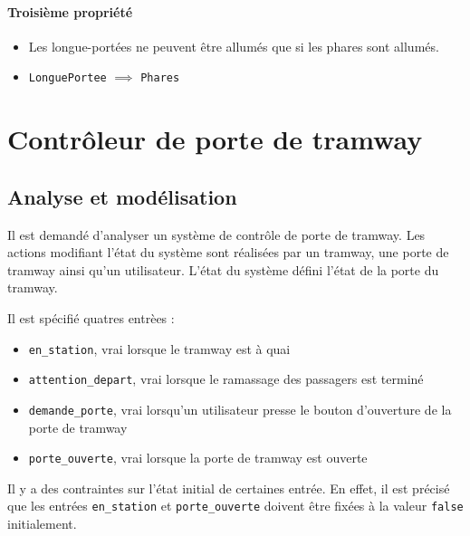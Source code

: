 \documentclass{article}
\begin{document}
      \paragraph{Troisième propriété}
        \begin{itemize}
          \item[] Les longue-portées ne peuvent être allumés que si les phares
            sont allumés.
          \item[] \noindent
            {\tt LonguePortee} $\implies$ {\tt Phares}
        \end{itemize}

  \section{Contrôleur de porte de tramway}
    \subsection{Analyse et modélisation}

      Il est demandé d'analyser un système de contrôle de porte de tramway. Les
      actions modifiant l'état du système sont réalisées par un tramway, une
      porte de tramway ainsi qu'un utilisateur. L'état du système défini l'état
      de la porte du tramway. \medskip

      Il est spécifié quatres entrèes :
      \begin{itemize}
        \item {\tt en\_station}, vrai lorsque le tramway est à quai
        \item {\tt attention\_depart}, vrai lorsque le ramassage des passagers
          est terminé
        \item {\tt demande\_porte}, vrai lorsqu'un utilisateur presse le bouton
          d'ouverture de la porte de tramway
        \item {\tt porte\_ouverte}, vrai lorsque la porte de tramway est ouverte
      \end{itemize} \vspace{1em}

      Il y a des contraintes sur l'état initial de certaines entrée. En effet,
      il est précisé que les entrées {\tt en\_station} et {\tt porte\_ouverte}
      doivent être fixées à la valeur {\tt false} initialement. \medskip
\end{document}

